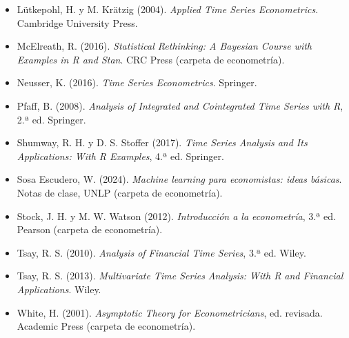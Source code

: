 \documentclass[11pt,a4paper]{article}
\begin{document}
{\begin{itemize}[leftmargin=1.4em,itemsep=1pt,label={}]
\item Lütkepohl, H. y M. Krätzig (2004). \emph{Applied Time Series Econometrics}. Cambridge University Press.
\item McElreath, R. (2016). \emph{Statistical Rethinking: A Bayesian Course with Examples in R and Stan}. CRC Press (carpeta de econometría).
\item Neusser, K. (2016). \emph{Time Series Econometrics}. Springer.
\item Pfaff, B. (2008). \emph{Analysis of Integrated and Cointegrated Time Series with R}, 2.ª ed. Springer.
\item Shumway, R. H. y D. S. Stoffer (2017). \emph{Time Series Analysis and Its Applications: With R Examples}, 4.ª ed. Springer.
\item Sosa Escudero, W. (2024). \emph{Machine learning para economistas: ideas básicas}. Notas de clase, UNLP (carpeta de econometría).
\item Stock, J. H. y M. W. Watson (2012). \emph{Introducción a la econometría}, 3.ª ed. Pearson (carpeta de econometría).
\item Tsay, R. S. (2010). \emph{Analysis of Financial Time Series}, 3.ª ed. Wiley.
\item Tsay, R. S. (2013). \emph{Multivariate Time Series Analysis: With R and Financial Applications}. Wiley.
\item White, H. (2001). \emph{Asymptotic Theory for Econometricians}, ed. revisada. Academic Press (carpeta de econometría).
\end{itemize}
}
\end{document}
